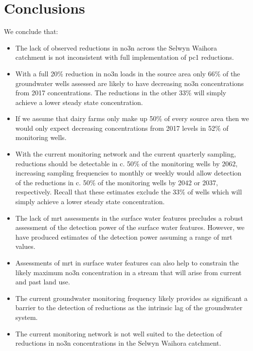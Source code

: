
\section[Conclusions]{Conclusions} \label{sec:conclusions}

We conclude that:
\begin{itemize}
    \item The lack of observed reductions in \gls{no3n} across the Selwyn Waihora catchment is not inconsistent with full implementation of \gls{pc1} reductions.
    \item With a full 20\% reduction in \gls{no3n} loads in the source area only 66\% of the groundwater wells assessed are likely to have decreasing \gls{no3n} concentrations from 2017 concentrations. The reductions in the other 33\% will simply achieve a lower steady state concentration.
    \item If we assume that dairy farms only make up 50\% of every source area then we would only expect decreasing concentrations from 2017 levels in 52\% of monitoring wells.
    \item With the current monitoring network and the current quarterly sampling, reductions should be detectable in c. 50\% of the monitoring wells by 2062, increasing sampling frequencies to monthly or weekly would allow detection of the reductions in c. 50\% of the monitoring wells by 2042 or 2037, respectively. Recall that these estimates exclude the 33\% of wells which will simply achieve a lower steady state concentration.
    \item The lack of \gls{mrt} assessments in the surface water features precludes a robust assessment of the detection power of the surface water features. However, we have produced estimates of the detection power assuming a range of \gls{mrt} values.
    \item Assessments of \gls{mrt} in surface water features can also help to constrain the likely maximum \gls{no3n} concentration in a stream that will arise from current and past land use.
    \item The current groundwater monitoring frequency likely provides as significant a barrier to the detection of reductions as the intrinsic lag of the groundwater system.
    \item The current monitoring network is not well suited to the detection of reductions in \gls{no3n} concentrations in the Selwyn Waihora catchment.
\end{itemize}

